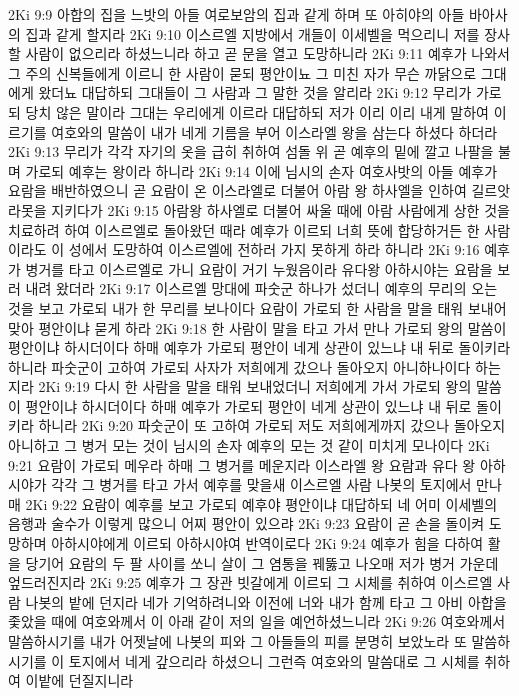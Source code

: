 2Ki 9:9  아합의 집을 느밧의 아들 여로보암의 집과 같게 하며 또 아히야의 아들 바아사의 집과 같게 할지라
2Ki 9:10  이스르엘 지방에서 개들이 이세벨을 먹으리니 저를 장사할 사람이 없으리라 하셨느니라 하고 곧 문을 열고 도망하니라
2Ki 9:11  예후가 나와서 그 주의 신복들에게 이르니 한 사람이 묻되 평안이뇨 그 미친 자가 무슨 까닭으로 그대에게 왔더뇨 대답하되 그대들이 그 사람과 그 말한 것을 알리라
2Ki 9:12  무리가 가로되 당치 않은 말이라 그대는 우리에게 이르라 대답하되 저가 이리 이리 내게 말하여 이르기를 여호와의 말씀이 내가 네게 기름을 부어 이스라엘 왕을 삼는다 하셨다 하더라
2Ki 9:13  무리가 각각 자기의 옷을 급히 취하여 섬돌 위 곧 예후의 밑에 깔고 나팔을 불며 가로되 예후는 왕이라 하니라
2Ki 9:14  이에 님시의 손자 여호사밧의 아들 예후가 요람을 배반하였으니 곧 요람이 온 이스라엘로 더불어 아람 왕 하사엘을 인하여 길르앗 라못을 지키다가
2Ki 9:15  아람왕 하사엘로 더불어 싸울 때에 아람 사람에게 상한 것을 치료하려 하여 이스르엘로 돌아왔던 때라 예후가 이르되 너희 뜻에 합당하거든 한 사람이라도 이 성에서 도망하여 이스르엘에 전하러 가지 못하게 하라 하니라
2Ki 9:16  예후가 병거를 타고 이스르엘로 가니 요람이 거기 누웠음이라 유다왕 아하시야는 요람을 보러 내려 왔더라
2Ki 9:17  이스르엘 망대에 파숫군 하나가 섰더니 예후의 무리의 오는 것을 보고 가로되 내가 한 무리를 보나이다 요람이 가로되 한 사람을 말을 태워 보내어 맞아 평안이냐 묻게 하라
2Ki 9:18  한 사람이 말을 타고 가서 만나 가로되 왕의 말씀이 평안이냐 하시더이다 하매 예후가 가로되 평안이 네게 상관이 있느냐 내 뒤로 돌이키라 하니라 파숫군이 고하여 가로되 사자가 저희에게 갔으나 돌아오지 아니하나이다 하는지라
2Ki 9:19  다시 한 사람을 말을 태워 보내었더니 저희에게 가서 가로되 왕의 말씀이 평안이냐 하시더이다 하매 예후가 가로되 평안이 네게 상관이 있느냐 내 뒤로 돌이키라 하니라
2Ki 9:20  파숫군이 또 고하여 가로되 저도 저희에게까지 갔으나 돌아오지 아니하고 그 병거 모는 것이 님시의 손자 예후의 모는 것 같이 미치게 모나이다
2Ki 9:21  요람이 가로되 메우라 하매 그 병거를 메운지라 이스라엘 왕 요람과 유다 왕 아하시야가 각각 그 병거를 타고 가서 예후를 맞을새 이스르엘 사람 나봇의 토지에서 만나매
2Ki 9:22  요람이 예후를 보고 가로되 예후야 평안이냐 대답하되 네 어미 이세벨의 음행과 술수가 이렇게 많으니 어찌 평안이 있으랴
2Ki 9:23  요람이 곧 손을 돌이켜 도망하며 아하시야에게 이르되 아하시야여 반역이로다
2Ki 9:24  예후가 힘을 다하여 활을 당기어 요람의 두 팔 사이를 쏘니 살이 그 염통을 꿰뚫고 나오매 저가 병거 가운데 엎드러진지라
2Ki 9:25  예후가 그 장관 빗갈에게 이르되 그 시체를 취하여 이스르엘 사람 나봇의 밭에 던지라 네가 기억하려니와 이전에 너와 내가 함께 타고 그 아비 아합을 좇았을 때에 여호와께서 이 아래 같이 저의 일을 예언하셨느니라
2Ki 9:26  여호와께서 말씀하시기를 내가 어젯날에 나봇의 피와 그 아들들의 피를 분명히 보았노라 또 말씀하시기를 이 토지에서 네게 갚으리라 하셨으니 그런즉 여호와의 말씀대로 그 시체를 취하여 이밭에 던질지니라
